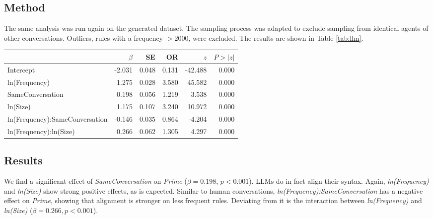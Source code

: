 \documentclass[11pt]{article}
\begin{document}
\subsection{Method}
The same analysis was run again on the generated dataset. The sampling process was adapted to exclude sampling from identical agents of other conversations. Outliers, rules with a frequency $>2000$, were excluded. The results are shown in Table \ref{tab:llm}.

\begin{table*}
  \centering
  \begin{tabular}{lrrrrr}
    \hline
    &$\beta$&SE&OR& $z$& $P>|z|$\\
    \hline
    Intercept&
    -2.031&0.048& 0.131&-42.488&0.000\\
    
    ln(Frequency)&
    1.275&0.028&3.580&45.582&0.000\\
    
    SameConversation&
    0.198&0.056&1.219&3.538&0.000\\
    
    ln(Size)&
    1.175&0.107&3.240&10.972&0.000\\
    ln(Frequency):SameConversation&
    -0.146&0.035&0.864&-4.204&0.000\\
    ln(Frequency):ln(Size)&
    0.266&0.062&1.305&4.297&0.000\\
    \hline
    
  \end{tabular}
  \caption{\label{tab:llm}
  Results of the GLMM on the samples drawn from the 124 GPT-40 conversations. Fixed effects, except \textit{SameConversation}, are centered. The model with the lowest $AIC$ was taken ($\Delta AIC>4$ compared to the second-best model).}
  

\end{table*}

\subsection{Results}
We find a significant effect of \textit{SameConversation} on \textit{Prime} ($\beta = 0.198$, $p < 0.001$). LLMs do in fact align their syntax. Again, \textit{ln(Frequency)} and \textit{ln(Size)} show strong positive effects, as is expected. Similar to human conversations, \textit{ln(Frequency):SameConversation} has a negative effect on \textit{Prime}, showing that alignment is stronger on less frequent rules. Deviating from it is the interaction between \textit{ln(Frequency)} and \textit{ln(Size)} ($\beta=0.266, p<0.001$).
\end{document}
